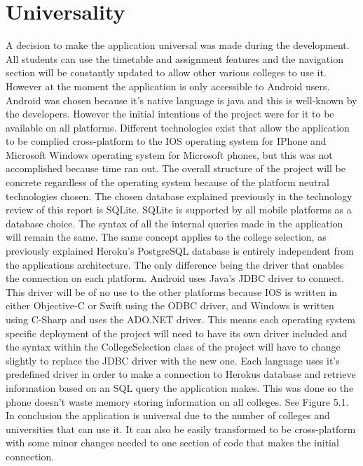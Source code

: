 \section{Universality}
A decision to make the application universal was made during the development. All students can use the timetable and assignment features and the navigation section will be constantly updated to allow other various colleges to use it. However at the moment the application is only accessible to Android users. Android was chosen because it's native language is java and this is well-known by the developers. However the initial intentions of the project were for it to be available on all platforms. Different technologies exist that allow the application to be complied cross-platform to the IOS operating system for IPhone and Microsoft Windows operating system for Microsoft phones, but this was not accomplished because time ran out. The overall structure of the project will be concrete regardless of the operating system because of the platform neutral technologies chosen. The chosen database explained previously in the technology review of this report is SQLite. SQLite is supported by all mobile platforms as a database choice. The syntax of all the internal queries made in the application will remain the same. The same concept applies to the college selection, as previously explained Heroku's PostgreSQL database is entirely independent from the applications architecture. The only difference being the driver that enables the connection on each platform. Android uses Java's JDBC driver to connect. This driver will be of no use to the other platforms because IOS is written in either Objective-C or Swift using the ODBC driver, and Windows is written using C-Sharp and uses the ADO.NET driver. This means each operating system specific deployment of the project will need to have its own driver included and the syntax within the CollegeSelection class of the project will have to change slightly to replace the JDBC driver with the new one. Each language uses it's predefined driver in order to make a connection to Herokus database and retrieve information based on an SQL query the application makes. This was done so the phone doesn't waste memory storing information on all colleges. See Figure 5.1.
In conclusion the application is universal due to the number of colleges and universities that can use it. It can also be easily transformed to be cross-platform with some minor changes needed to one section of code that makes the initial connection.

